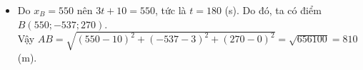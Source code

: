 \begin{ex}
{\begin{itemize}
			Vì thế, ta có $\vv{AM}=\dfrac{3t}{2}\vv{u}=\left(3t;-3t;\dfrac{3t}{2}\right)$.\\
			Gọi tọa độ của điểm $M$ là $(x_M;y_M;z_M)$.\\
			Do $\vv{AM}=(x_M-x_A;y_M-y_A;z_M-z_A)=\left(3t;-3t;\dfrac{3t}{2}\right)$ nên $$\heva{&x_M=3t+x_A\\&y_M=-3t+y_A\\&z_M=\dfrac{3t}{2}+z_A}\Leftrightarrow\heva{&x_M=3t+10\\&y_M=-3t+3\\&z_M=\dfrac{3t}{2}.}$$
			Vậy điểm $M$ có tọa độ là $\left(3t+10;-3t+3;\dfrac{3t}{2}\right)$.
			\item Do $x_B=550$ nên $3t+10=550$, tức là $t=180$ (s). Do đó, ta có điểm $B(550;-537;270)$.\\
			Vậy $AB=\sqrt{(550-10)^2+(-537-3)^2+(270-0)^2}=\sqrt{656100}=810$ (m).
		\end{itemize}
	}
\end{ex}
